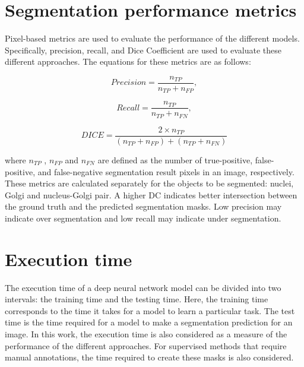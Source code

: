 \section{Segmentation performance metrics}
\label{section:metrics}

Pixel-based metrics are used to evaluate the performance of the different models. Specifically, precision, recall, and Dice Coefficient are used to evaluate these different approaches. The equations for these metrics are as follows:

\begin{equation}
    Precision = \frac{n_{TP}}{n_{TP}+n_{FP}},
\end{equation}

\begin{equation}
    Recall = \frac{n_{TP}}{n_{TP}+n_{FN}},
\end{equation}

\begin{equation}
 DICE =\frac{2 \times n_{TP}}{(n_{TP}+n_{FP})+(n_{TP}+n_{FN})}
\end{equation}

\noindent where $n_{TP}$ , $n_{FP}$ and $n_{FN}$ are defined as the number of true-positive, false-positive, and false-negative segmentation result pixels in an image, respectively. These metrics are calculated separately for the objects to be segmented: nuclei, Golgi and nucleus-Golgi pair. A higher \ac{DC} indicates better intersection between the ground truth and the predicted segmentation masks. Low precision may indicate over segmentation and low recall may indicate under segmentation.

\section{Execution time}
\label{section:execution_time}

The execution time of a deep neural network model can be divided into two intervals: the training time and the testing time. Here, the training time corresponds to the time it takes for a model to learn a particular task. The test time is the time required for a model to make a segmentation prediction for an image. In this work, the execution time is also considered as a measure of the performance of the different approaches. For supervised methods that require manual annotations, the time required to create these masks is also considered.